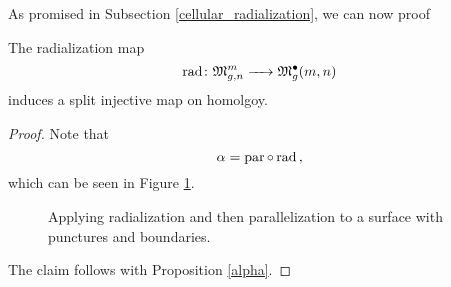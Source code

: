 As promised in Subsection \ref{cellular_radialization}, we can now proof

\begin{cor}\label{cor_rad_injective}
   The radialization map 
   \[
      \operatorname{rad} \colon \mathfrak{M}^m_{g,n} \xrightarrow{\hspace{6pt}{}\hspace{6pt}} \mathfrak{M}^\bullet_g(m, n)
   \]
   induces a split injective map on homolgoy.
   \begin{proof}
       Note that 
       \[
          \alpha = \operatorname{par} \circ \operatorname{rad}\,,
       \]
       which can be seen in Figure \ref{rad_injective}.
       \begin{figure}[ht]
	\centering
	\def\svgwidth{\columnwidth}
	
	\caption{\label{rad_injective} Applying radialization and then parallelization to a surface with punctures and boundaries.}
	\end{figure}
	The claim follows with Proposition \ref{alpha}.
   \end{proof}
\end{cor}
